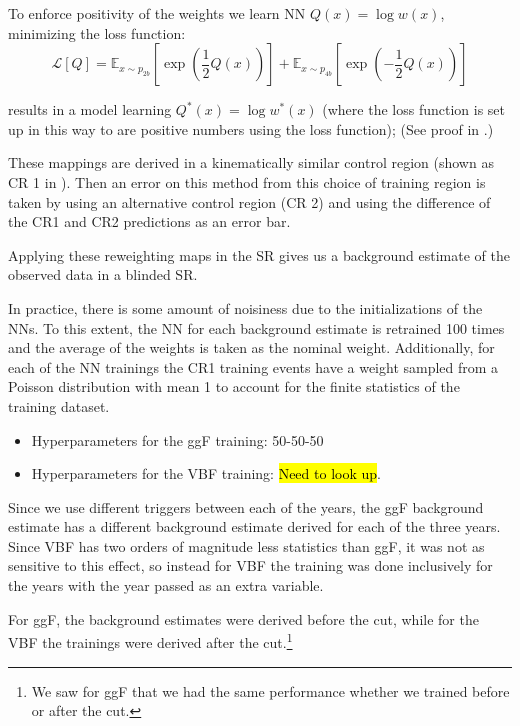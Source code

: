 To enforce positivity of  the weights  we learn NN $Q(x) = \log w(x)$, minimizing the loss function: 
\begin{equation}
	\mathcal{L}[Q] = \mathbb{E}_{x\sim p_{2b}} \left[ \exp\left(  \frac{1}{2} Q(x) \right) \right] + \mathbb{E}_{x\sim p_{4b}} \left[ \exp\left(  - \frac{1}{2} Q(x) \right) \right]
\end{equation}

results in a model learning $Q^*(x) = \log w^*(x)$ (where the loss function is set up in this way to  are positive numbers using the loss function);
(See proof in \sect{\ref{rw-loss-fct}}.)

These mappings are derived in a kinematically similar control region (shown as CR 1 in \Fig{\ref{fig:ggF-massplanes-allYrs-dat-4b-preXwt}}). Then an error on this method from this choice of training region is taken by using an alternative control region (CR 2) and using the difference of the CR1 and CR2 predictions as an error bar.

Applying these reweighting maps in the SR gives us a background estimate of the observed data in a blinded SR.

In practice, there is some amount of noisiness due to the initializations of the NNs. To this extent, the NN for each background estimate is retrained 100 times and the average of the weights is taken as the nominal weight.
Additionally, for each of the NN trainings the CR1 training events have a weight sampled from a Poisson distribution with mean 1 to account for the finite statistics of the training dataset.

\begin{itemize}
	\item Hyperparameters for the ggF training: 50-50-50
	\item Hyperparameters for the VBF training: \hl{Need to look up}.
\end{itemize}

Since we use different triggers between each of the years, the ggF background estimate has a different background estimate derived for each of the three years. Since VBF has two orders of magnitude less statistics than ggF, it was not as sensitive to this effect, so instead for VBF the training was done inclusively for the years with the year passed as an extra variable.

For ggF, the background estimates were derived before the \Xwt cut, while for the VBF the trainings were derived after the \Xwt cut.\footnote{We saw for ggF that we had the same performance whether we trained before or after the \Xwt cut.}
 


